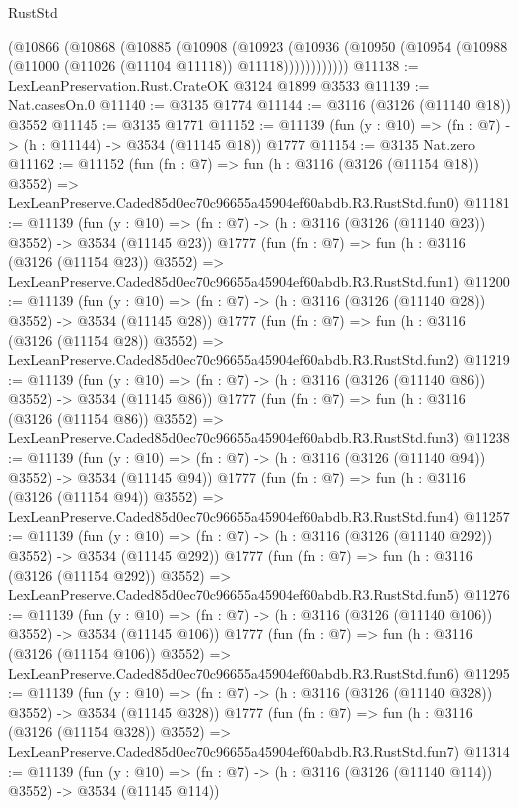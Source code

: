 \begin{lexlean}{RustStd}
\begin{coremodule}
        (@10866
          (@10868
            (@10885
              (@10908
                (@10923
                  (@10936
                    (@10950 (@10954 (@10988 (@11000 (@11026 (@11104 @11118)) @11118))))))))))))
@11138 := LexLeanPreservation.Rust.CrateOK @3124 @1899 @3533
@11139 := Nat.casesOn.{0}
@11140 := @3135 @1774
@11144 := @3116 (@3126 (@11140 @18)) @3552
@11145 := @3135 @1771
@11152 := @11139 (fun (y : @10) => (fn : @7) -> (h : @11144) -> @3534 (@11145 @18)) @1777
@11154 := @3135 Nat.zero
@11162 := @11152
    (fun (fn : @7) =>
    fun (h : @3116 (@3126 (@11154 @18)) @3552) =>
    LexLeanPreserve.Caded85d0ec70c96655a45904ef60abdb.R3.RustStd.fun0)
@11181 := @11139
    (fun (y : @10) => (fn : @7) -> (h : @3116 (@3126 (@11140 @23)) @3552) -> @3534 (@11145 @23))
    @1777
    (fun (fn : @7) =>
    fun (h : @3116 (@3126 (@11154 @23)) @3552) =>
    LexLeanPreserve.Caded85d0ec70c96655a45904ef60abdb.R3.RustStd.fun1)
@11200 := @11139
    (fun (y : @10) => (fn : @7) -> (h : @3116 (@3126 (@11140 @28)) @3552) -> @3534 (@11145 @28))
    @1777
    (fun (fn : @7) =>
    fun (h : @3116 (@3126 (@11154 @28)) @3552) =>
    LexLeanPreserve.Caded85d0ec70c96655a45904ef60abdb.R3.RustStd.fun2)
@11219 := @11139
    (fun (y : @10) => (fn : @7) -> (h : @3116 (@3126 (@11140 @86)) @3552) -> @3534 (@11145 @86))
    @1777
    (fun (fn : @7) =>
    fun (h : @3116 (@3126 (@11154 @86)) @3552) =>
    LexLeanPreserve.Caded85d0ec70c96655a45904ef60abdb.R3.RustStd.fun3)
@11238 := @11139
    (fun (y : @10) => (fn : @7) -> (h : @3116 (@3126 (@11140 @94)) @3552) -> @3534 (@11145 @94))
    @1777
    (fun (fn : @7) =>
    fun (h : @3116 (@3126 (@11154 @94)) @3552) =>
    LexLeanPreserve.Caded85d0ec70c96655a45904ef60abdb.R3.RustStd.fun4)
@11257 := @11139
    (fun (y : @10) => (fn : @7) -> (h : @3116 (@3126 (@11140 @292)) @3552) -> @3534 (@11145 @292))
    @1777
    (fun (fn : @7) =>
    fun (h : @3116 (@3126 (@11154 @292)) @3552) =>
    LexLeanPreserve.Caded85d0ec70c96655a45904ef60abdb.R3.RustStd.fun5)
@11276 := @11139
    (fun (y : @10) => (fn : @7) -> (h : @3116 (@3126 (@11140 @106)) @3552) -> @3534 (@11145 @106))
    @1777
    (fun (fn : @7) =>
    fun (h : @3116 (@3126 (@11154 @106)) @3552) =>
    LexLeanPreserve.Caded85d0ec70c96655a45904ef60abdb.R3.RustStd.fun6)
@11295 := @11139
    (fun (y : @10) => (fn : @7) -> (h : @3116 (@3126 (@11140 @328)) @3552) -> @3534 (@11145 @328))
    @1777
    (fun (fn : @7) =>
    fun (h : @3116 (@3126 (@11154 @328)) @3552) =>
    LexLeanPreserve.Caded85d0ec70c96655a45904ef60abdb.R3.RustStd.fun7)
@11314 := @11139
    (fun (y : @10) => (fn : @7) -> (h : @3116 (@3126 (@11140 @114)) @3552) -> @3534 (@11145 @114))

\end{coremodule}
\end{lexlean}
